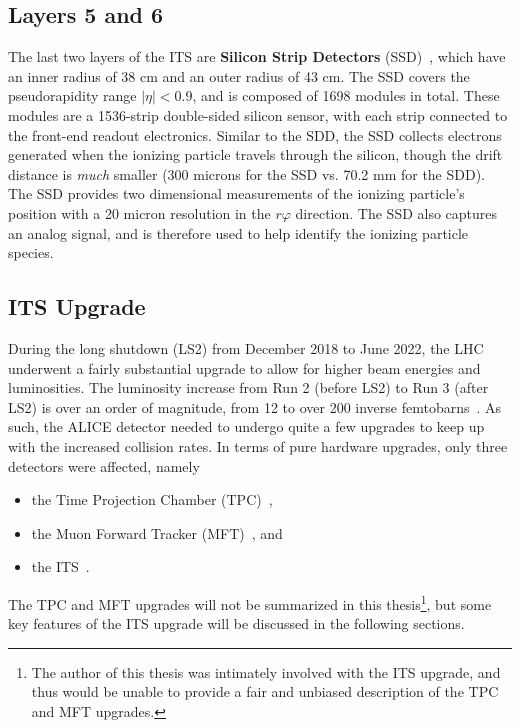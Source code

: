 \subsection{Layers 5 and 6}
The last two layers of the ITS are \textbf{Silicon Strip Detectors} (SSD)~\cite{ITSSSD}, which have an inner radius of 38 cm and an outer radius of 43 cm. The SSD covers the pseudorapidity range $|\eta| < 0.9$, and is composed of 1698 modules in total. These modules are a 1536-strip double-sided silicon sensor, with each strip connected to the front-end readout electronics. Similar to the SDD, the SSD collects electrons generated when the ionizing particle travels through the silicon, though the drift distance is \textit{much} smaller (300 microns for the SSD vs. 70.2 mm for the SDD). The SSD provides two dimensional measurements of the ionizing particle's position with a 20 micron resolution in the $r\varphi$ direction. The SSD also captures an analog signal, and is therefore used to help identify the ionizing particle species.


\subsection{ITS Upgrade}
During the long shutdown (LS2) from December 2018 to June 2022, the LHC underwent a fairly substantial upgrade to allow for higher beam energies and luminosities. The luminosity increase from Run 2 (before LS2) to Run 3 (after LS2) is over an order of magnitude, from 12 to over 200 inverse femtobarns~\cite{LHCUpgrade}. As such, the ALICE detector needed to undergo quite a few upgrades to keep up with the increased collision rates. In terms of pure hardware upgrades, only three detectors were affected, namely
\begin{itemize}
    \item the Time Projection Chamber (TPC)~\cite{TPCUpgrade},
    \item the Muon Forward Tracker (MFT)~\cite{MFTUpgrade}, and
    \item the ITS~\cite{ITSUpgrade}.
\end{itemize}
The TPC and MFT upgrades will not be summarized in this thesis\footnote{The author of this thesis was intimately involved with the ITS upgrade, and thus would be unable to provide a fair and unbiased description of the TPC and MFT upgrades.}, but some key features of the ITS upgrade will be discussed in the following sections.

